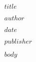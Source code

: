 \documentclass[12pt,a4paper]{article}
\begin{document}
\begin{titlepage}
    \centering
    \vspace*{2cm}
    
    {\huge\bfseries $title$ \par}
    \vspace{1.5cm}
    
    {\Large $author$ \par}
    \vspace{1cm}
    
    {\large $date$ \par}
    
    \vfill
    
    {\large $publisher$ \par}
\end{titlepage}

\tableofcontents
\newpage

$body$
\end{document}
